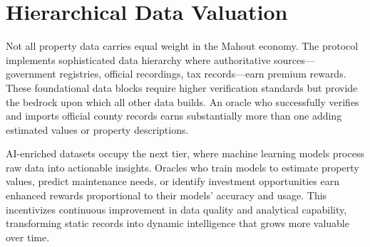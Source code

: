 \section{Hierarchical Data Valuation}

Not all property data carries equal weight in the Mahout economy. The protocol implements sophisticated data hierarchy where authoritative sources---government registries, official recordings, tax records---earn premium rewards. These foundational data blocks require higher verification standards but provide the bedrock upon which all other data builds. An oracle who successfully verifies and imports official county records earns substantially more than one adding estimated values or property descriptions.

AI-enriched datasets occupy the next tier, where machine learning models process raw data into actionable insights. Oracles who train models to estimate property values, predict maintenance needs, or identify investment opportunities earn enhanced rewards proportional to their models' accuracy and usage. This incentivizes continuous improvement in data quality and analytical capability, transforming static records into dynamic intelligence that grows more valuable over time.

